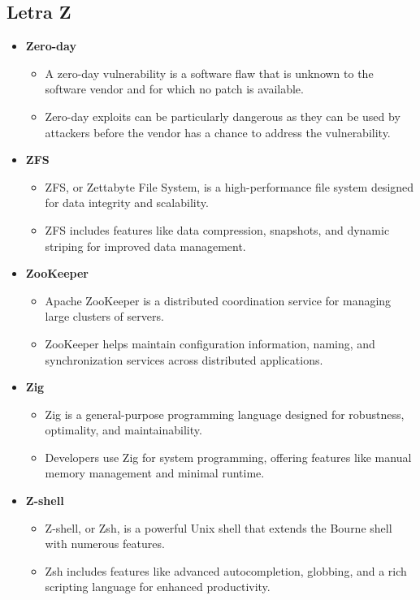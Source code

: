     \subsection{Letra Z}
    \begin{itemize}
        \item \textbf{Zero-day}
        \begin{itemize}
            \item A zero-day vulnerability is a software flaw that is unknown to the software vendor and for which no patch is available.
            \item Zero-day exploits can be particularly dangerous as they can be used by attackers before the vendor has a chance to address the vulnerability.
        \end{itemize}
        \item \textbf{ZFS}
        \begin{itemize}
            \item ZFS, or Zettabyte File System, is a high-performance file system designed for data integrity and scalability.
            \item ZFS includes features like data compression, snapshots, and dynamic striping for improved data management.
        \end{itemize}
        \item \textbf{ZooKeeper}
        \begin{itemize}
            \item Apache ZooKeeper is a distributed coordination service for managing large clusters of servers.
            \item ZooKeeper helps maintain configuration information, naming, and synchronization services across distributed applications.
        \end{itemize}
        \item \textbf{Zig}
        \begin{itemize}
            \item Zig is a general-purpose programming language designed for robustness, optimality, and maintainability.
            \item Developers use Zig for system programming, offering features like manual memory management and minimal runtime.
        \end{itemize}
        \item \textbf{Z-shell}
        \begin{itemize}
            \item Z-shell, or Zsh, is a powerful Unix shell that extends the Bourne shell with numerous features.
            \item Zsh includes features like advanced autocompletion, globbing, and a rich scripting language for enhanced productivity.
        \end{itemize}
    \end{itemize}

